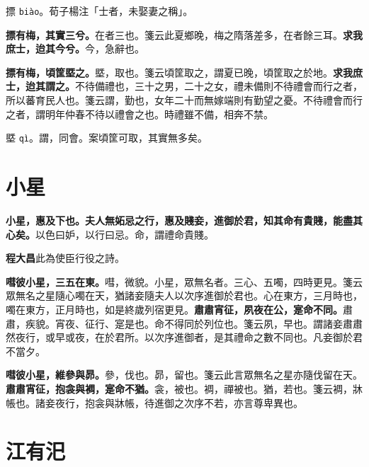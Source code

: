 \begin{quoting}摽 \texttt{biào}。荀子楊注「士者，未娶妻之稱」。\end{quoting}

\textbf{摽有梅，其實三兮。}{\footnotesize 在者三也。箋云此夏鄉晚，梅之隋落差多，在者餘三耳。}\textbf{求我庶士，迨其今兮。}{\footnotesize 今，急辭也。}

\textbf{摽有梅，頃筐塈之。}{\footnotesize 塈，取也。箋云頃筐取之，謂夏已晚，頃筐取之於地。}\textbf{求我庶士，迨其謂之。}{\footnotesize 不待備禮也，三十之男，二十之女，禮未備則不待禮會而行之者，所以蕃育民人也。箋云謂，勤也，女年二十而無嫁端則有勤望之憂。不待禮會而行之者，謂明年仲春不待以禮會之也。時禮雖不備，相奔不禁。}

\begin{quoting}塈 \texttt{qì}。謂，同會。案頃筐可取，其實無多矣。\end{quoting}

\section{小星}


\textbf{小星，惠及下也。夫人無妬忌之行，惠及賤妾，進御於君，知其命有貴賤，能盡其心矣。}{\footnotesize 以色曰妒，以行曰忌。命，謂禮命貴賤。}

\begin{quoting}\textbf{程大昌}此為使臣行役之詩。\end{quoting}

\textbf{嘒彼小星，三五在東。}{\footnotesize 嘒，微貌。小星，眾無名者。三心、五噣，四時更見。箋云眾無名之星隨心噣在天，猶諸妾隨夫人以次序進御於君也。心在東方，三月時也，噣在東方，正月時也，如是終歲列宿更見。}\textbf{肅肅宵征，夙夜在公，寔命不同。}{\footnotesize 肅肅，疾貌。宵夜、征行、寔是也。命不得同於列位也。箋云夙，早也。謂諸妾肅肅然夜行，或早或夜，在於君所。以次序進御者，是其禮命之數不同也。凡妾御於君不當夕。}

\textbf{嘒彼小星，維參與昴。}{\footnotesize 參，伐也。昴，留也。箋云此言眾無名之星亦隨伐留在天。}\textbf{肅肅宵征，抱衾與裯，寔命不猶。}{\footnotesize 衾，被也。裯，禪被也。猶，若也。箋云裯，牀帳也。諸妾夜行，抱衾與牀帳，待進御之次序不若，亦言尊卑異也。}

\section{江有汜}


